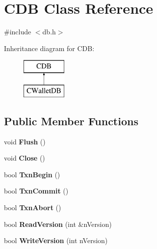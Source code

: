 \hypertarget{class_c_d_b}{}\section{C\+DB Class Reference}
\label{class_c_d_b}


{\ttfamily \#include $<$db.\+h$>$}

Inheritance diagram for C\+DB\+:\begin{figure}[H]
\begin{center}
\leavevmode
\includegraphics[height=2.000000cm]{class_c_d_b}
\end{center}
\end{figure}
\subsection*{Public Member Functions}
\begin{DoxyCompactItemize}
\item 
\mbox{\label{class_c_d_b_ab4a0447a8d19b4871b9fcc40edee9480}} 
void {\bfseries Flush} ()
\item 
\mbox{\label{class_c_d_b_af8bbf106662d67cdfdd6d58c429bc54b}} 
void {\bfseries Close} ()
\item 
\mbox{\label{class_c_d_b_a6f817da7947e1498e44034b7a1c8ac10}} 
bool {\bfseries Txn\+Begin} ()
\item 
\mbox{\label{class_c_d_b_a45061b3e71251dc74ddd868afb760590}} 
bool {\bfseries Txn\+Commit} ()
\item 
\mbox{\label{class_c_d_b_af9b0924f1ca98e0544e78e9bb58b4f03}} 
bool {\bfseries Txn\+Abort} ()
\item 
\mbox{\label{class_c_d_b_a16f591e27f41397570018c1fae084025}} 
bool {\bfseries Read\+Version} (int \&n\+Version)
\item 
\mbox{\label{class_c_d_b_aa3e63c0921af4c6fc92def1ba14500f1}} 
bool {\bfseries Write\+Version} (int n\+Version)
\end{DoxyCompactItemize}
